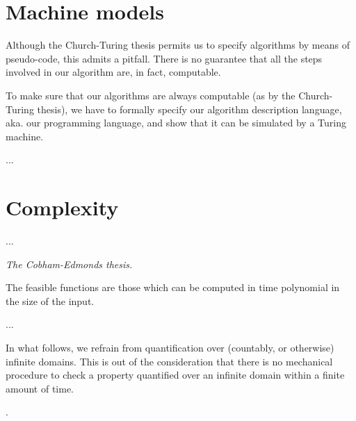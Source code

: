 \section{Machine models}

Although the Church-Turing thesis permits us to specify algorithms by means of
pseudo-code, this admits a pitfall. There is no guarantee that all the steps
involved in our algorithm are, in fact, computable.

To make sure that our algorithms are always computable (as by the Church-Turing
thesis), we have to formally specify our algorithm description language, aka.
our programming language, and show that it can be simulated by a Turing
machine.

...





\section{Complexity}

...

\begin{notion} \emph{The Cobham-Edmonds thesis.}

The feasible functions are those which can be computed in time polynomial in
the size of the input.

\end{notion}

...


In what follows, we refrain from quantification over (countably, or otherwise)
infinite domains. This is out of the consideration that there is no mechanical
procedure to check a property quantified over an infinite domain within a
finite amount of time.

.
